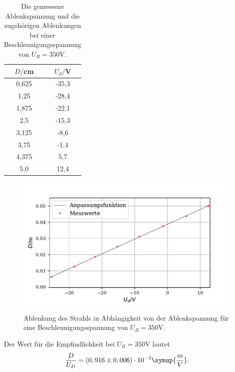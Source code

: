 \begin{table}[H]
  \centering
  \caption{Die gemessene Ablenkspannung und die zugehörigen Ablenkungen bei einer Beschleunigungsspannung von $U_B = 350 \si{\volt}$.}
  \label{tab:Parameter}
  \begin{tabular}{c c}
    \toprule
    $D/$cm& $U_d/$V \\
    \bottomrule
     0,625 & -35,3  \\
     1,25 & -28,4 \\
     1,875 & -22,1  \\
     2,5 & -15,3 \\
     3,125 & -8,6  \\
     3,75& -1,4 \\
     4,375 & 5,7  \\
     5,0 &  12,4 \\
     \bottomrule
  \end{tabular}
\end{table}

\begin{figure}[H]
  \centering
  \includegraphics{plot6.pdf}
  \caption{Ablenkung des Strahls in Abhängigkeit von der Ablenkspannung für eine Beschleunigungsspannung von $U_B = 350 \si{\volt}$. }
  \label{fig:plot}
\end{figure}

Der Wert für die Empfindlichkeit bei $U_B = 350 \si{\volt}$ lautet
\begin{align*}
\frac{D}{U_D} = (0,916 \pm 0,006) \cdot 10^{-3} \symup{\frac{m}{V}} .
\end{align*}

